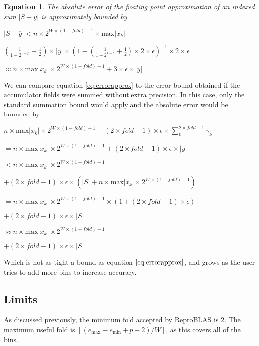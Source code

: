 \documentclass[12pt]{article}
\providecommand{\floor}[1]{\left \lfloor #1 \right \rfloor }
\providecommand{\min}{\ensuremath{\text{min}}}
\providecommand{\max}{\ensuremath{\text{max}}}
\theoremstyle{plain}
\newtheorem{eq}{Equation}[section]
\begin{document}
    \begin{eq} The absolute error of the floating point approximation of an indexed sum $|S - \overline{y}|$ is approximately bounded by

      $|S - \overline{y}| < n \times 2^{W \times (1 - fold) - 1} \times \max|x_k| + $

      \indent \indent$(\frac{1}{1 - 2^{1 - p}} + \frac{1}{2})\times|\overline{y}|\times (1 - (\frac{1}{1 - 2^{1 - p}} + \frac{1}{2})\times 2 \times \epsilon)^{-1} \times 2 \times \epsilon$

      \indent\indent$\approx n \times \max|x_k|\times 2^{W \times (1 - fold) - 1} + 3 \times \epsilon \times |\overline{y}|$
      \label{eq:error2approx}
    \end{eq}

    We can compare equation \ref{eq:errorapprox} to the error bound obtained if the accumulator fields were summed without extra precision. In this case, only the standard summation bound would apply and the absolute error would be bounded by

    $n \times \max|x_k|\times 2^{W \times (1 - fold) - 1} + (2 \times fold - 1) \times \epsilon \times \sum\limits_0^{2 \times fold - 1}\gamma_k$

    \indent\indent $= n \times \max|x_k|\times 2^{W \times (1 - fold) - 1} + (2 \times fold - 1) \times \epsilon \times |y|$

    \indent\indent$< n \times \max|x_k|\times 2^{W \times (1 - fold) - 1}$

    \indent\indent\indent$ + (2 \times fold - 1) \times \epsilon \times (|S| + n \times \max|x_k|\times 2^{W \times (1 - fold) - 1})$

    \indent\indent$= n \times \max|x_k|\times 2^{W \times (1 - fold) - 1}\times (1 + (2 \times fold - 1)\times \epsilon)$

    \indent\indent\indent$ + (2 \times fold - 1) \times \epsilon \times |S|$

    \indent\indent$\approx n \times \max|x_k|\times 2^{W \times (1 - fold) - 1}$

    \indent\indent\indent$ + (2 \times fold - 1) \times \epsilon \times |S|$

    Which is not as tight a bound as equation $\ref{eq:errorapprox}$, and grows as the user tries to add more bins to increase accuracy.
  \subsection{Limits}
    \label{sec:limits}
    As discussed previously, the minimum fold accepted by ReproBLAS is 2. The maximum useful fold is $\floor{(e_{\max} - e_{\min} + p - 2)/W}$, as this covers all of the bins.
\end{document}
